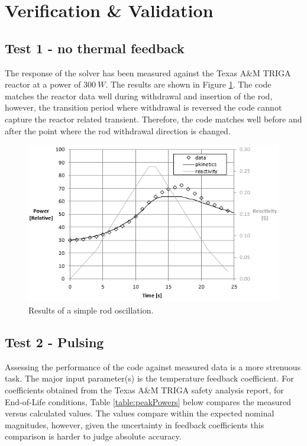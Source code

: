 \documentclass[11pt,letterpaper,titlepage]{article}
\begin{document}
\newpage
{}
\section{Verification \& Validation}
\subsection{Test 1 - no thermal feedback}
The response of the solver has been measured against the Texas A\&M TRIGA reactor at a power of $300 \ W$. The results are shown in Figure \ref{figure:Test1}. The code matches the reactor data well during withdrawal and insertion of the rod, however, the transition period where withdrawal is reversed the code cannot capture the reactor related transient. Therefore, the code matches well before and after the point where the rod withdrawal direction is changed.

\begin{center}
	\begin{minipage}[c]{0.82\textwidth}

		\begin{figure}[H]
		
			\includegraphics{Test1.png}
			\caption{Results of a simple rod oscillation.}
			\label{figure:Test1}
		\end{figure}
	\end{minipage}
\end{center}

\subsection{Test 2 - Pulsing}
Assessing the performance of the code against measured data is a more strenuous task. The major input parameter(s) is the temperature feedback coefficient. For coefficients obtained from the Texas A\&M TRIGA safety analysis report, for End-of-Life conditions, Table \ref{table:peakPowers} below compares the measured versus calculated values. The values compare within the expected nominal magnitudes, however, given the uncertainty in feedback coefficients this comparison is harder to judge absolute accuracy.
\end{document}
